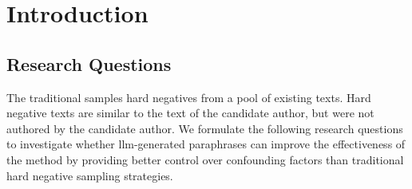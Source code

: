 \chapter{Introduction}
\label{chap:introduction}



\section{Research Questions}
\label{sec:research_questions}

The traditional \impAppr{} samples hard negatives from a pool of existing texts.
Hard negative texts are similar to the text of the candidate author, but were not authored by the candidate author.
We formulate the following research questions to investigate whether \ac{llm}-generated paraphrases can improve the effectiveness of the \imp{} method by providing better control over confounding factors than traditional hard negative sampling strategies.
